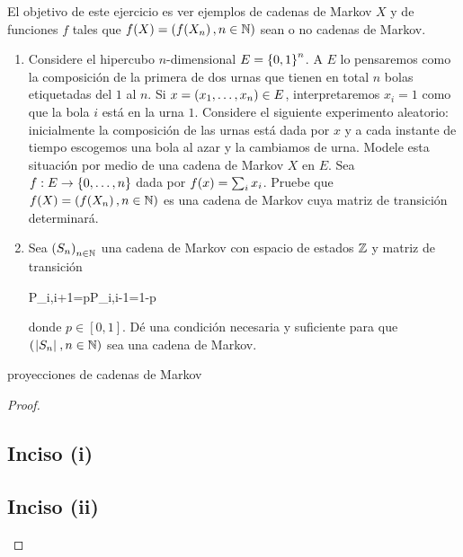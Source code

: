 \begin{problema}
	El objetivo de este ejercicio es ver ejemplos de cadenas de Markov $X$ y de funciones $f$ tales que 
	$f\!\left( X\right) =\left( f\!\left( X_n\right) ,n\in\mathbb{N}\right) $ sean o no cadenas de Markov.
	
	\begin{enumerate}
	\item[(i)]	[\ref{problema4_3:inciso1}]
		Considere el hipercubo $n$-dimensional $E=\left\{ 0,1\right\} ^n$. A $E$ lo pensaremos como la composici\'on 
		de la primera de dos urnas que tienen en total $n$ bolas etiquetadas del $1$ al $n$. 
		Si $x=\left( x_1,\ldots, x_n\right) \in E$, interpretaremos $x_i=1$ como que la bola $i$ est\'a en la urna $1$. 
		Considere el siguiente experimento aleatorio: inicialmente la composici\'on de las urnas est\'a dada por 
		$x$ y a cada instante de tiempo escogemos una bola al azar y la cambiamos de urna. 
		Modele esta situaci\'on por medio de una cadena de Markov $X$ en $E$. Sea $f:E\to \left\{ 0,\ldots, n\right\} $ 
		dada por $f\!\left( x\right) =\sum_i x_i$. Pruebe que $f\!\left( X\right) =\left( f\!\left( X_n\right) ,n\in\mathbb{N}\right) $ es una cadena de 
		Markov cuya matriz de transici\'on determinar\'a.

	\item[(ii)]	[\ref{problema4_3:inciso2}]
		Sea $\left( S_n\right) _{n\in\mathbb{N}}$ una cadena de Markov con espacio de estados $\mathbb{Z}$ y matriz de transici\'on
		\begin{esn}
		P_{i,i+1}=p\quad P_{i,i-1}=1-p
		\end{esn}	
		donde $p\in [0,1]$. D\'e una condici\'on necesaria y suficiente para que $\left( \hspace{.25mm}\left|S_n\right|\hspace{.25mm},n\in\mathbb{N}\right) $ 
		sea una cadena de Markov.
	\end{enumerate}

 proyecciones de cadenas de Markov
\end{problema}

\begin{proof}
    \subsection{Inciso (i)} \label{problema4_3:inciso1}
    
    \newpage

    \subsection{Inciso (ii)} \label{problema4_3:inciso2}
    
\end{proof}